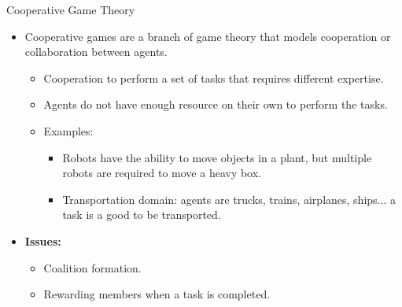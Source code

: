 \documentclass{beamer}
\begin{document}
\begin{frame}{Cooperative Game Theory}
  \begin{itemize}
     \item Cooperative games are a branch of game theory that models cooperation or collaboration between agents.
     \begin{itemize}
        \item Cooperation to perform a set of tasks that requires different expertise.
        \item Agents do not have enough resource on their own to perform the tasks.
        \item Examples:
        \begin{itemize}
            \item Robots have the ability to move objects in a plant, but multiple robots are required to move a heavy box.
            \item Transportation domain: agents are trucks, trains, airplanes, ships... a task is a good to be transported.
        \end{itemize}
    \end{itemize}
    \item \textbf{Issues:}
        \begin{itemize}
            \item Coalition formation.
            \item Rewarding members when a task is completed.
        \end{itemize}
  \end{itemize}
\end{frame}
\end{document}
